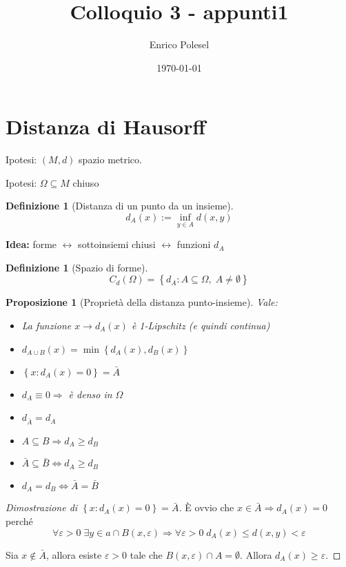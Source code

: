 \documentclass[a4paper,10pt]{article}
\title{Colloquio 3 - appunti1}
\author{Enrico Polesel}
\date{\today}
\newcounter{counter1}
\theoremstyle{plain}
\newtheorem{mypro}[counter1]{Proposizione}
\theoremstyle{definition}
\newtheorem{mydef}[counter1]{Definizione}
\theoremstyle{remark}
\newcommand{\set}[1]{\left\{#1\right\}}
\begin{document}
\maketitle

\section{Distanza di Hausorff}

Ipotesi: $(M,d)$ spazio metrico.

Ipotesi: $\Omega \subseteq M$ chiuso

\begin{mydef}[Distanza di un punto da un insieme]
\[  d_A (x) := \inf _{y \in A} d(x,y) \] 
\end{mydef}

\textbf{Idea:} forme $\leftrightarrow$ sottoinsiemi chiusi
$\leftrightarrow$ funzioni $d_A$

\begin{mydef}[Spazio di forme]
  \[ C_d(\Omega) = \set{d_A : A \subseteq \Omega,\; A \neq \emptyset} \]
\end{mydef}

\begin{mypro}[Proprietà della distanza punto-insieme]
  Vale:
  \begin{itemize}
  \item La funzione $x \rightarrow d_A(x)$ è 1-Lipschitz (e quindi
    continua)
  \item $d_{A\cup B}(x) = \min\set{d_A(x),d_B(x)}$
  \item $\set{x:d_A(x) = 0} = \bar A$
  \item $d_A \equiv 0 \Rightarrow $ è denso in $\Omega$
  \item $d_{\bar A} = d_A$
  \item $A\subseteq B \Rightarrow d_A \ge d_B$
  \item $\bar A \subseteq \bar B \Leftrightarrow d_A \ge d_B$
  \item $d_A = d_B \Leftrightarrow \bar A = \bar B$
  \end{itemize}
\end{mypro}
\begin{proof} [Dimostrazione di $\set{x:d_A(x) = 0} = \bar A$]
  \`E ovvio che $x\in \bar A \Rightarrow d_A(x) = 0$ perché 
  \[ \forall \varepsilon > 0\; \exists y \in a \cap B(x,\varepsilon)
  \Rightarrow \forall \varepsilon > 0 \; d_A(x) \le d(x,y) <
  \varepsilon \]

  Sia $x\not\in \bar A$, allora esiste $\varepsilon>0$ tale che
  $B(x,\varepsilon) \cap A = \emptyset$. Allora $d_A(x) \ge
  \varepsilon$.
\end{proof}
\end{document}

